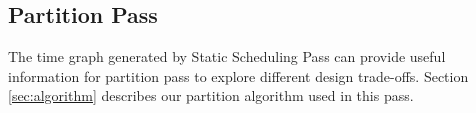 


\iffalse
\subsection{Partition Pass}
The time graph generated by Static Scheduling Pass can provide useful information for partition pass to explore different design trade-offs. Section \ref{sec:algorithm} describes our partition algorithm used in this pass.

